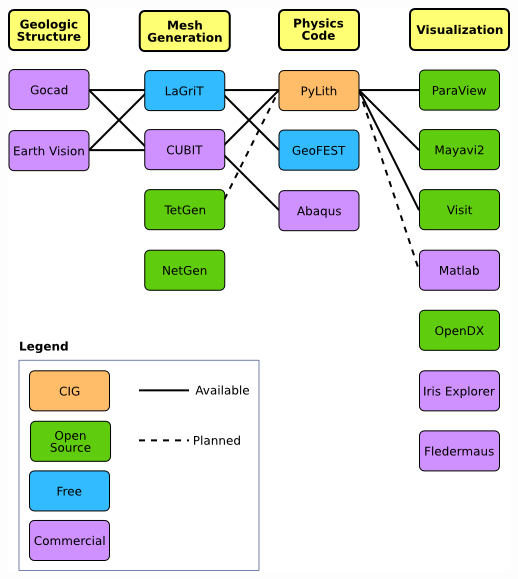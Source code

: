 \documentclass[pdftex,cig,slideColor]{pp4slides}
\begin{document}
  \vfill
  \begin{center}
    \includegraphics[scale=0.9]{figs/workflow}
  \end{center}

  \summary{}
\end{document}
